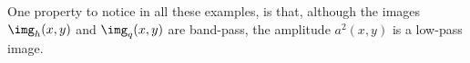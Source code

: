 One property to notice in all these examples, is that, although the images $\img_h(x,y)$ and $\img_q(x,y)$ are band-pass, the amplitude $a^2(x,y)$ is a low-pass image. %
%
